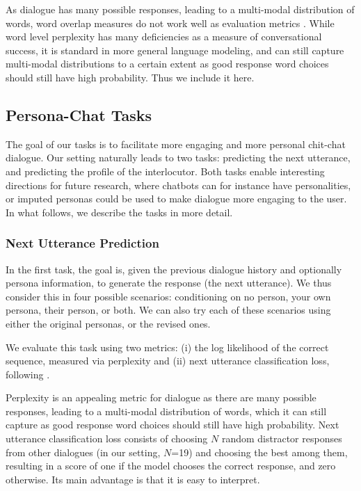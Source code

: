 As dialogue has many possible responses, leading to a multi-modal distribution of words, word overlap measures do not work well as evaluation metrics \citep{liu2016not,serban2015survey}.
While word level perplexity has many deficiencies as a measure of conversational success, it is standard in more general language modeling, 
and can still capture multi-modal distributions to a certain extent as 
good response word choices should still have high probability.
Thus we include it here.
\fi

\subsection{Persona-Chat Tasks}

The goal of our tasks is to facilitate more engaging and more personal chit-chat dialogue. Our setting naturally leads to two tasks: predicting the next utterance, and predicting the profile of the interlocutor. Both tasks enable interesting directions for future research, where chatbots can for instance have personalities, or imputed personas could be used to make dialogue more engaging to the user. In what follows, we describe the tasks in more detail.

\subsubsection{Next Utterance Prediction}

In the first task, the goal is, given the previous dialogue history and optionally persona information, to generate the response (the next utterance). We thus consider this in four possible scenarios: conditioning on no person, your own persona, their person, or both. We can also try each of these scenarios using either the original personas, or the revised ones.

We evaluate this task using two metrics: (i) the log likelihood of the correct sequence, measured via perplexity and (ii) 
next utterance classification loss, following \cite{lowe2015ubuntu}.

Perplexity is an appealing metric for dialogue as there are many possible responses, leading to a multi-modal distribution of words, which it can still capture as good response word choices should still have high probability. Next utterance classification loss consists of choosing $N$ random distractor responses from other dialogues (in our setting, $N$=19) and choosing the best among them, resulting in a score of one if the model chooses the correct response, and zero otherwise. Its main advantage is that it is easy to interpret.

